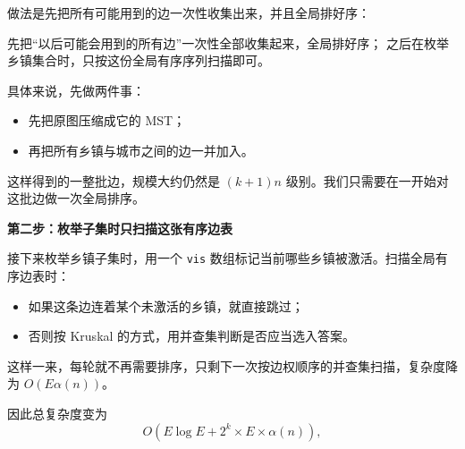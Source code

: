 \documentclass{book}
\newcommand{\code}[1]{\colorbox{codebg}{\texttt{#1}}}  %
\begin{document}
做法是先把所有可能用到的边一次性收集出来，并且全局排好序：

\begin{center}
先把“以后可能会用到的所有边”一次性全部收集起来，全局排好序；  
之后在枚举乡镇集合时，只按这份全局有序序列扫描即可。
\end{center}

具体来说，先做两件事：

\begin{itemize}[itemsep=2pt, topsep=2pt, parsep=0pt, partopsep=0pt]
    \item 先把原图压缩成它的 MST；
    \item 再把所有乡镇与城市之间的边一并加入。
\end{itemize}

这样得到的一整批边，规模大约仍然是 $(k+1)n$ 级别。我们只需要在一开始对这批边做一次全局排序。

\par\medskip
\noindent\textbf{第二步：枚举子集时只扫描这张有序边表}
\par\medskip
接下来枚举乡镇子集时，用一个 \code{vis} 数组标记当前哪些乡镇被激活。扫描全局有序边表时：

\begin{itemize}[itemsep=2pt, topsep=2pt, parsep=0pt, partopsep=0pt]
    \item 如果这条边连着某个未激活的乡镇，就直接跳过；
    \item 否则按 Kruskal 的方式，用并查集判断是否应当选入答案。
\end{itemize}

这样一来，每轮就不再需要排序，只剩下一次按边权顺序的并查集扫描，复杂度降为 $O(E \alpha(n))$。

因此总复杂度变为
\[
O(E \log E + 2^k \times E \times \alpha(n)),
\]
\end{document}
